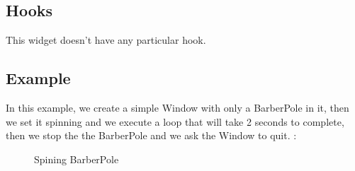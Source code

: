 \subsection{Hooks}

This widget doesn't have any particular hook.

\subsection{Example}


In this example, we create a simple Window with only a BarberPole in it, then we set it spinning and we execute a loop that will take 2 seconds to complete, then we stop the the BarberPole and we ask the Window to quit. :

\begin{figure}[ht!]
\centering
{}
\label{s47}
\caption{Spining BarberPole}
\end{figure}
